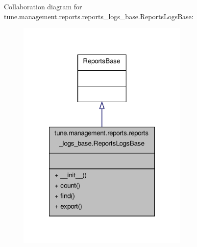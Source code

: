 Collaboration diagram for tune.\-management.\-reports.\-reports\-\_\-logs\-\_\-base.\-Reports\-Logs\-Base\-:
\nopagebreak
\begin{figure}[H]
\begin{center}
\leavevmode
\includegraphics[width=240pt]{classtune_1_1management_1_1reports_1_1reports__logs__base_1_1ReportsLogsBase__coll__graph}
\end{center}
\end{figure}
